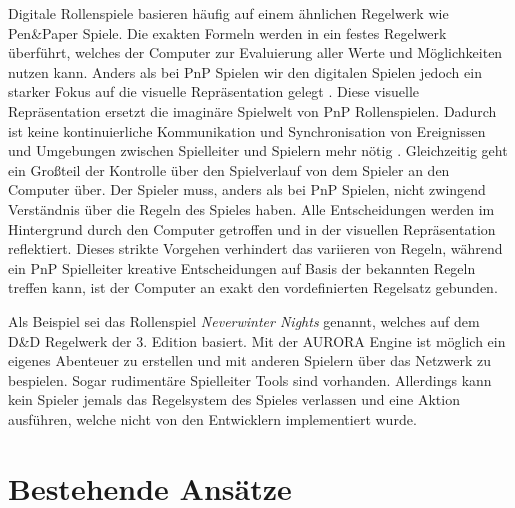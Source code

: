 Digitale Rollenspiele basieren häufig auf einem ähnlichen Regelwerk wie Pen\&Paper Spiele. Die exakten Formeln werden in ein festes Regelwerk überführt, welches der Computer zur Evaluierung aller Werte und Möglichkeiten nutzen kann. Anders als bei PnP Spielen wir den digitalen Spielen jedoch ein starker Fokus auf die visuelle Repräsentation gelegt \cite{Tychsen2006}. Diese visuelle Repräsentation ersetzt die imaginäre Spielwelt von PnP Rollenspielen. Dadurch ist keine kontinuierliche Kommunikation und Synchronisation von Ereignissen und Umgebungen zwischen Spielleiter und Spielern mehr nötig \cite{Drachen2008}. \newline
Gleichzeitig geht ein Großteil der Kontrolle über den Spielverlauf von dem Spieler an den Computer über. Der Spieler muss, anders als bei PnP Spielen, nicht zwingend Verständnis über die Regeln des Spieles haben. Alle Entscheidungen werden im Hintergrund durch den Computer getroffen und in der visuellen Repräsentation reflektiert. Dieses strikte Vorgehen verhindert das variieren von Regeln, während ein PnP Spielleiter kreative Entscheidungen auf Basis der bekannten Regeln treffen kann, ist der Computer an exakt den vordefinierten Regelsatz gebunden. \cite{Drachen2008}

Als Beispiel sei das Rollenspiel \emph{Neverwinter Nights} genannt, welches auf dem D\&D Regelwerk der 3. Edition basiert. Mit der AURORA Engine ist möglich ein eigenes Abenteuer zu erstellen und mit anderen Spielern über das Netzwerk zu bespielen. Sogar rudimentäre Spielleiter Tools sind vorhanden. Allerdings kann kein Spieler jemals das Regelsystem des Spieles verlassen und eine Aktion ausführen, welche nicht von den Entwicklern implementiert wurde.



\section{Bestehende Ansätze}
\label{sec:BekannteAnsaetze}

